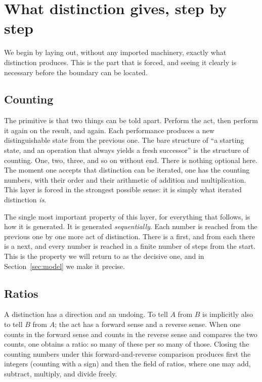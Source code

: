 \documentclass[11pt,a4paper]{article}
\theoremstyle{definition}
\theoremstyle{remark}
\begin{document}
\section{What distinction gives, step by step}

We begin by laying out, without any imported machinery, exactly what
distinction produces. This is the part that is forced, and seeing it clearly is
necessary before the boundary can be located.

\subsection{Counting}

The primitive is that two things can be told apart. Perform the act, then
perform it again on the result, and again. Each performance produces a new
distinguishable state from the previous one. The bare structure of ``a starting
state, and an operation that always yields a fresh successor'' is the structure
of counting. One, two, three, and so on without end. There is nothing optional
here. The moment one accepts that distinction can be iterated, one has the
counting numbers, with their order and their arithmetic of addition and
multiplication. This layer is forced in the strongest possible sense: it is
simply what iterated distinction \emph{is}.

The single most important property of this layer, for everything that follows,
is how it is generated. It is generated \emph{sequentially}. Each number is
reached from the previous one by one more act of distinction. There is a first,
and from each there is a next, and every number is reached in a finite number of
steps from the start. This is the property we will return to as the decisive
one, and in Section~\ref{sec:model} we make it precise.

\subsection{Ratios}

A distinction has a direction and an undoing. To tell $A$ from $B$ is implicitly
also to tell $B$ from $A$; the act has a forward sense and a reverse sense. When
one counts in the forward sense and counts in the reverse sense and compares the
two counts, one obtains a ratio: so many of these per so many of those. Closing
the counting numbers under this forward-and-reverse comparison produces first the
integers (counting with a sign) and then the field of ratios, where one may add,
subtract, multiply, and divide freely.
\end{document}
